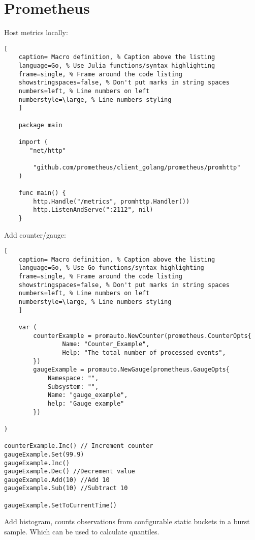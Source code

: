 \documentclass[11pt]{scrartcl} %
\begin{document}
\section{Prometheus}

Host metrics locally:

\begin{lstlisting}[
	caption= Macro definition, % Caption above the listing
	language=Go, % Use Julia functions/syntax highlighting
	frame=single, % Frame around the code listing
	showstringspaces=false, % Don't put marks in string spaces
	numbers=left, % Line numbers on left
	numberstyle=\large, % Line numbers styling
	]

	package main

	import (
       "net/http"

        "github.com/prometheus/client_golang/prometheus/promhttp"
	)

	func main() {
        http.Handle("/metrics", promhttp.Handler())
        http.ListenAndServe(":2112", nil)
	}

\end{lstlisting}


Add counter/gauge:

\begin{lstlisting}[
	caption= Macro definition, % Caption above the listing
	language=Go, % Use Go functions/syntax highlighting
	frame=single, % Frame around the code listing
	showstringspaces=false, % Don't put marks in string spaces
	numbers=left, % Line numbers on left
	numberstyle=\large, % Line numbers styling
	]

	var (
        counterExample = promauto.NewCounter(prometheus.CounterOpts{
                Name: "Counter_Example",
                Help: "The total number of processed events",
        })
		gaugeExample = promauto.NewGauge(prometheus.GaugeOpts{
			Namespace: "",
			Subsystem: "",
			Name: "gauge_example",
			help: "Gauge example"
		})

)

counterExample.Inc() // Increment counter
gaugeExample.Set(99.9)
gaugeExample.Inc()
gaugeExample.Dec() //Decrement value
gaugeExample.Add(10) //Add 10
gaugeExample.Sub(10) //Subtract 10

gaugeExample.SetToCurrentTime()

\end{lstlisting}

Add histogram, counts observations from configurable static buckets in a burst sample. Which can be used to calculate
quantiles. 
\end{document}
